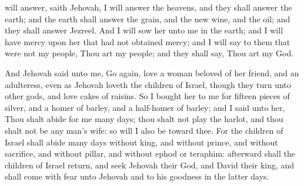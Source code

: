 will answer, saith Jehovah, I will answer the heavens, and they shall answer the earth; and the earth shall answer the grain, and the new wine, and the oil; and they shall answer Jezreel. And I will sow her unto me in the earth; and I will have mercy upon her that had not obtained mercy; and I will say to them that were not my people, Thou art my people; and they shall say, Thou art my God. 

And Jehovah said unto me, Go again, love a woman beloved of her friend, and an adulteress, even as Jehovah loveth the children of Israel, though they turn unto other gods, and love cakes of raisins. So I bought her to me for fifteen pieces of silver, and a homer of barley, and a half-homer of barley; and I said unto her, Thou shalt abide for me many days; thou shalt not play the harlot, and thou shalt not be any man’s wife: so will I also be toward thee. For the children of Israel shall abide many days without king, and without prince, and without sacrifice, and without pillar, and without ephod or teraphim: afterward shall the children of Israel return, and seek Jehovah their God, and David their king, and shall come with fear unto Jehovah and to his goodness in the latter days. 

